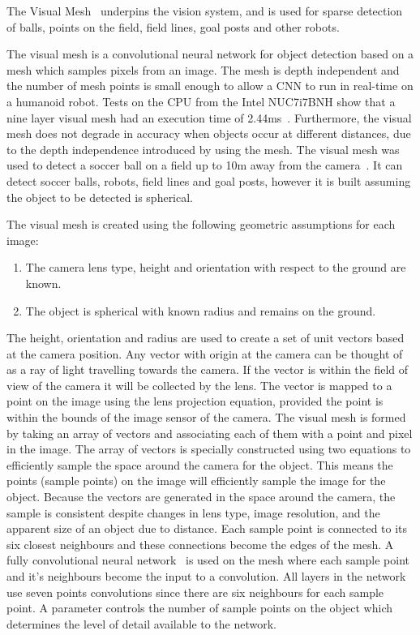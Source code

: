 \documentclass{llncs}
\begin{document}
\medskip

The Visual Mesh~\cite{Houliston2018VisualMR} underpins the vision system, and is used for sparse detection of balls, points on the field, field lines, goal posts and other robots.

The visual mesh is a convolutional neural network for object detection based on a mesh which samples pixels from an image. The mesh is depth independent and the number of mesh points is small enough to allow a CNN to run in real-time on a humanoid robot. Tests on the CPU from the Intel\textsuperscript{\textregistered} NUC7i7BNH show that a nine layer visual mesh had an execution time of 2.44ms~\cite{Houliston2018VisualMR}. Furthermore, the visual mesh does not degrade in accuracy when objects occur at different distances, due to the depth independence introduced by using the mesh. The visual mesh was used to detect a soccer ball on a field up to 10m away from the camera~\cite{Houliston2018VisualMR}. It can detect soccer balls, robots, field lines and goal posts, however it is built assuming the object to be detected is spherical.

The visual mesh is created using the following geometric assumptions for each image:
\begin{enumerate}
    \item The camera lens type, height and orientation with respect to the ground are known. 
    \item The object is spherical with known radius and remains on the ground.
\end{enumerate}

The height, orientation and radius are used to create a set of unit vectors based at the camera position. Any vector with origin at the camera can be thought of as a ray of light travelling towards the camera. If the vector is within the field of view of the camera it will be collected by the lens. The vector is mapped to a point on the image using the lens projection equation, provided the point is within the bounds of the image sensor of the camera. The visual mesh is formed by taking an array of vectors and associating each of them with a point and pixel in the image. The array of vectors is specially constructed using two equations to efficiently sample the space around the camera for the object. This means the points (sample points) on the image will efficiently sample the image for the object. Because the vectors are generated in the space around the camera, the sample is consistent despite changes in lens type, image resolution, and the apparent size of an object due to distance. Each sample point is connected to its six closest neighbours and these connections become the edges of the mesh. A fully convolutional neural network~\cite{ShelmarLong2017} is used on the mesh where each sample point and it's neighbours become the input to a convolution. All layers in the network use seven points convolutions since there are six neighbours for each sample point. A parameter controls the number of sample points on the object which determines the level of detail available to the network. 
\end{document}
